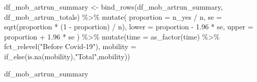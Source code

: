 \documentclass[
  letterpaper,
  DIV=11,
  numbers=noendperiod]{scrartcl}
\newenvironment{Shaded}{\begin{snugshade}}{\end{snugshade}}
\newcommand{\AttributeTok}[1]{\textcolor[rgb]{0.40,0.45,0.13}{#1}}
\newcommand{\DecValTok}[1]{\textcolor[rgb]{0.68,0.00,0.00}{#1}}
\newcommand{\FloatTok}[1]{\textcolor[rgb]{0.68,0.00,0.00}{#1}}
\newcommand{\FunctionTok}[1]{\textcolor[rgb]{0.28,0.35,0.67}{#1}}
\newcommand{\NormalTok}[1]{\textcolor[rgb]{0.00,0.23,0.31}{#1}}
\newcommand{\OtherTok}[1]{\textcolor[rgb]{0.00,0.23,0.31}{#1}}
\newcommand{\SpecialCharTok}[1]{\textcolor[rgb]{0.37,0.37,0.37}{#1}}
\newcommand{\StringTok}[1]{\textcolor[rgb]{0.13,0.47,0.30}{#1}}
\begin{document}
\begin{Shaded}
\begin{Highlighting}[]
\NormalTok{df\_mob\_artrun\_summary }\OtherTok{\textless{}{-}} \FunctionTok{bind\_rows}\NormalTok{(df\_mob\_artrun\_summary, df\_mob\_artrun\_totals) }\SpecialCharTok{\%\textgreater{}\%}
  \FunctionTok{mutate}\NormalTok{(}
    \AttributeTok{proportion =}\NormalTok{ n\_yes }\SpecialCharTok{/}\NormalTok{ n,}
    \AttributeTok{se =} \FunctionTok{sqrt}\NormalTok{(proportion }\SpecialCharTok{*}\NormalTok{ (}\DecValTok{1} \SpecialCharTok{{-}}\NormalTok{ proportion) }\SpecialCharTok{/}\NormalTok{ n),}
    \AttributeTok{lower =}\NormalTok{ proportion }\SpecialCharTok{{-}} \FloatTok{1.96} \SpecialCharTok{*}\NormalTok{ se,}
    \AttributeTok{upper =}\NormalTok{ proportion }\SpecialCharTok{+} \FloatTok{1.96} \SpecialCharTok{*}\NormalTok{ se}
\NormalTok{  ) }\SpecialCharTok{\%\textgreater{}\%} 
 \FunctionTok{mutate}\NormalTok{(}\AttributeTok{time =} \FunctionTok{as\_factor}\NormalTok{(time) }\SpecialCharTok{\%\textgreater{}\%} 
           \FunctionTok{fct\_relevel}\NormalTok{(}\StringTok{"Before Covid{-}19"}\NormalTok{),}
         \AttributeTok{mobility =} \FunctionTok{if\_else}\NormalTok{(}\FunctionTok{is.na}\NormalTok{(mobility),}\StringTok{"Total"}\NormalTok{,mobility))}




  
\NormalTok{df\_mob\_artrun\_summary}
\end{Highlighting}
\end{Shaded}
\end{document}
